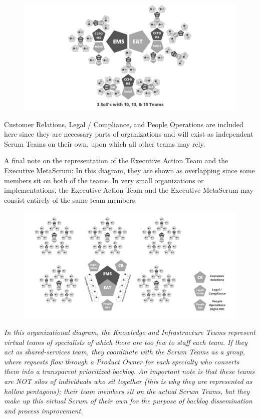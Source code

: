 \documentclass[12pt,a4paper,parskip=full]{scrartcl}
\begin{document}
\begin{figure}[H]
    \centering
    \includegraphics[scale=0.15]{5.png}
\end{figure}

Customer Relations, Legal / Compliance, and People Operations are included here since they are necessary parts of organizations and will exist as independent Scrum Teams on their own, upon which all other teams may rely.

A final note on the representation of the Executive Action Team and the Executive MetaScrum: In this diagram, they are shown as overlapping since some members sit on both of the teams. In very small organizations or implementations, the Executive Action Team and the Executive MetaScrum may consist entirely of the same team members.

\begin{figure}[H]
    \centering
    \includegraphics[scale=0.15]{6.png}
\end{figure}


\emph{In this organizational diagram, the Knowledge and Infrastructure Teams represent virtual teams of specialists of which there are too few to staff each team. If they act as shared-services team, they coordinate with the Scrum Teams as a group, where requests flow through a Product Owner for each specialty who converts them into a transparent prioritized backlog. An important note is that these teams are NOT silos of individuals who sit together (this is why they are represented as hollow pentagons); their team members sit on the actual Scrum Teams, but they make up this virtual Scrum of their own for the purpose of backlog dissemination and process improvement.}
\end{document}

